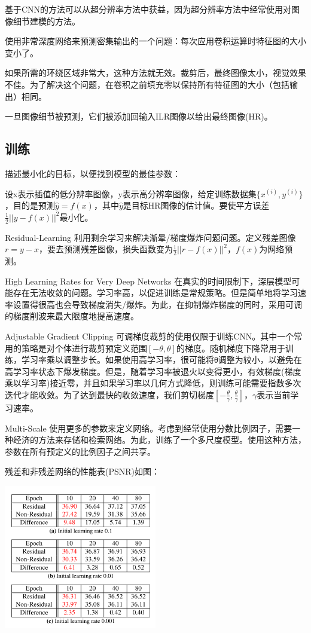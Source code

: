 \documentclass[UTF8,a4paper,10pt]{ctexrep}
\begin{document}
基于CNN的方法可以从超分辨率方法中获益，因为超分辨率方法中经常使用对图像细节建模的方法。

使用非常深度网络来预测密集输出的一个问题：每次应用卷积运算时特征图的大小变小了。

如果所需的环绕区域非常大，这种方法就无效。裁剪后，最终图像太小，视觉效果不佳。为了解决这个问题，在卷积之前填充零以保持所有特征图的大小（包括输出）相同。

一旦图像细节被预测，它们被添加回输入ILR图像以给出最终图像(HR)。

\subsection{训练}
描述最小化的目标，以便找到模型的最佳参数：

设x表示插值的低分辨率图像，y表示高分辨率图像，给定训练数据集$\{x^{(i)},y^{(i)}\}$，目的是预测$\hat{y}=f(x)$，其中$\hat{y}$是目标HR图像的估计值。要使平方误差$\frac{1}{2}||y-f(x)||^2$最小化。

Residual-Learning 利用剩余学习来解决渐晕/梯度爆炸问题问题。定义残差图像$r=y-x$，要去预测残差图像，损失函数变为$\frac{1}{2}||r-f(x)||^2$，$f(x)$为网络预测。

High Learning Rates for Very Deep Networks 在真实的时间限制下，深层模型可能存在无法收敛的问题。学习率高，以促进训练是常规策略。但是简单地将学习速率设置得很高也会导致梯度消失/爆炸。为此，在抑制爆炸梯度的同时，采用可调的梯度削波来最大限度地提高速度。

Adjustable Gradient Clipping 可调梯度裁剪的使用仅限于训练CNN。其中一个常用的策略是对个体进行裁剪预定义范围$[-\theta,\theta]$的梯度。随机梯度下降常用于训练，学习率乘以调整步长。如果使用高学习率，很可能将θ调整为较小，以避免在高学习率状态下爆发梯度。但是，随着学习率被退火以变得更小，有效梯度(梯度乘以学习率)接近零，并且如果学习率以几何方式降低，则训练可能需要指数多次迭代才能收敛。为了达到最快的收敛速度，我们剪切梯度$[-\frac{\theta}{\gamma},\frac{\theta}{\gamma}]$，$\gamma$表示当前学习速率。

Multi-Scale 使用更多的参数来定义网络。考虑到经常使用分数比例因子，需要一种经济的方法来存储和检索网络。为此，训练了一个多尺度模型。使用这种方法，参数在所有预定义的比例因子之间共享。

残差和非残差网络的性能表(PSNR)如图：

\includegraphics[width=0.5\textwidth]{figure/cancha.png}
\end{document}

